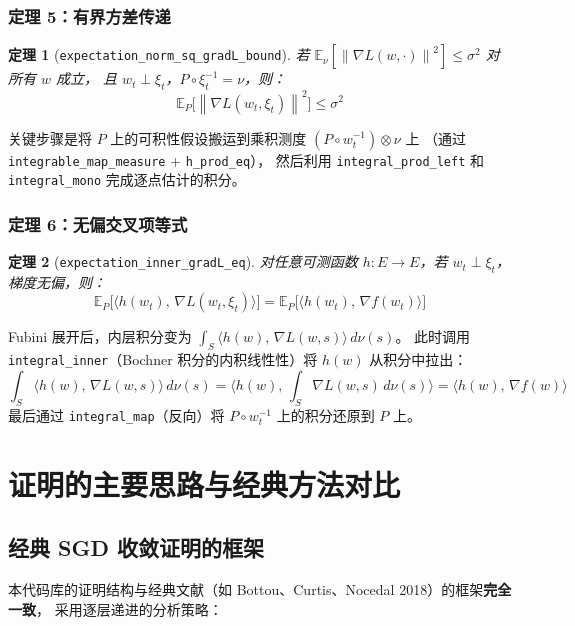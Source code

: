 \documentclass[12pt, a4paper]{article}
\newtheorem{theorem}{定理}[section]
\newcommand{\E}{\mathbb{E}}
\newcommand{\ip}[2]{\langle #1,\, #2 \rangle}
\newcommand{\norm}[1]{\left\| #1 \right\|}
\newcommand{\lean}[1]{\texttt{#1}}
\begin{document}
\subsubsection{定理 5：有界方差传递}

\begin{theorem}[\lean{expectation\_norm\_sq\_gradL\_bound}]
若 $\E_\nu[\norm{\nabla L(w, \cdot)}^2] \leq \sigma^2$ 对所有 $w$ 成立，
且 $w_t \perp \xi_t$，$P \circ \xi_t^{-1} = \nu$，则：
\[
  \E_P\bigl[\norm{\nabla L(w_t, \xi_t)}^2\bigr] \leq \sigma^2
\]
\end{theorem}

关键步骤是将 $P$ 上的可积性假设搬运到乘积测度 $(P \circ w_t^{-1}) \otimes \nu$ 上
（通过 \lean{integrable\_map\_measure} + \lean{h\_prod\_eq}），
然后利用 \lean{integral\_prod\_left} 和 \lean{integral\_mono} 完成逐点估计的积分。

\subsubsection{定理 6：无偏交叉项等式}

\begin{theorem}[\lean{expectation\_inner\_gradL\_eq}]
对任意可测函数 $h : E \to E$，若 $w_t \perp \xi_t$，梯度无偏，则：
\[
  \E_P\bigl[\ip{h(w_t)}{\nabla L(w_t, \xi_t)}\bigr] = \E_P\bigl[\ip{h(w_t)}{\nabla f(w_t)}\bigr]
\]
\end{theorem}

Fubini 展开后，内层积分变为 $\int_S \ip{h(w)}{\nabla L(w,s)}\, d\nu(s)$。
此时调用 \lean{integral\_inner}（Bochner 积分的内积线性性）将 $h(w)$ 从积分中拉出：
\[
  \int_S \ip{h(w)}{\nabla L(w,s)}\, d\nu(s) = \ip{h(w)}{\int_S \nabla L(w,s)\, d\nu(s)} = \ip{h(w)}{\nabla f(w)}
\]
最后通过 \lean{integral\_map}（反向）将 $P \circ w_t^{-1}$ 上的积分还原到 $P$ 上。

\section{证明的主要思路与经典方法对比}

\subsection{经典 SGD 收敛证明的框架}

本代码库的证明结构与经典文献（如 Bottou、Curtis、Nocedal 2018）的框架\textbf{完全一致}，
采用逐层递进的分析策略：
\end{document}
